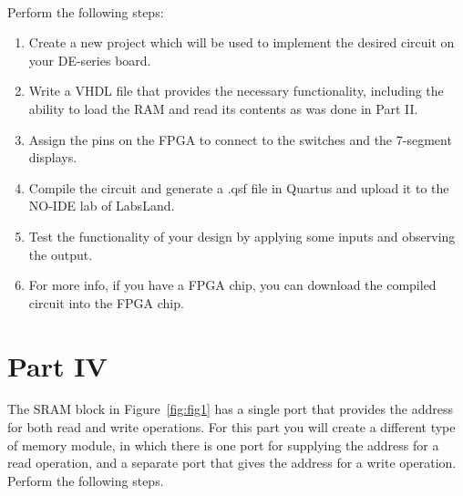 \documentclass[epsfig,10pt,fullpage]{article}
\begin{document}
~\\
Perform the following steps:

\begin{enumerate}
\item Create a new project which will be used to implement the desired
circuit on your DE-series board.
\item Write a VHDL file that provides the necessary functionality,
including the ability to load the RAM and read its contents as was done in
Part II.
\item Assign the pins on the FPGA to connect to the switches and the 
7-segment displays.
\item Compile the circuit and generate a .qsf file in Quartus and upload it to the NO-IDE lab of LabsLand.
\item Test the functionality of your design by applying some inputs
and observing the output.
\item For more info, if you have a FPGA chip, you can download the compiled circuit into the FPGA chip.
\end{enumerate}

\section*{Part IV}
The SRAM block in Figure~\ref{fig:fig1} has a single port that provides the address for 
both read and write operations. For this part you will create a different type of memory module,
in which there is one port for supplying the address for a read operation, and a separate
port that gives the address for a write operation. Perform the following steps.
\end{document}
